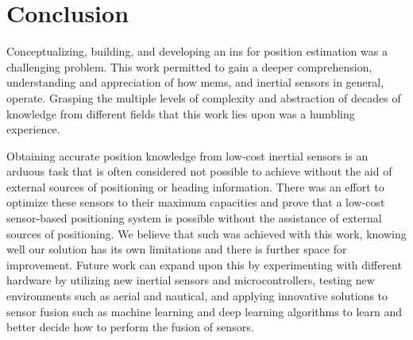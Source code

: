 \section{Conclusion}
Conceptualizing, building, and developing an \acrfull{ins} for position estimation was a challenging problem. This work permitted to gain a deeper comprehension, understanding and appreciation of how \acrshort{mems}, and inertial sensors in general, operate. Grasping the multiple levels of complexity and abstraction of decades of knowledge from different fields that this work lies upon was a humbling experience.

Obtaining accurate position knowledge from low-cost inertial sensors is an arduous task that is often considered not possible to achieve without the aid of external sources of positioning or heading information. There was an effort to optimize these sensors to their maximum capacities and prove that a low-cost sensor-based positioning system is possible without the assistance of external sources of positioning. We believe that such was achieved with this work, knowing well our solution has its own limitations and there is further space for improvement. Future work can expand upon this by experimenting with different hardware by utilizing new inertial sensors and microcontrollers, testing new environments such as aerial and nautical, and applying innovative solutions to sensor fusion such as machine learning and deep learning algorithms to learn and better decide how to perform the fusion of sensors.